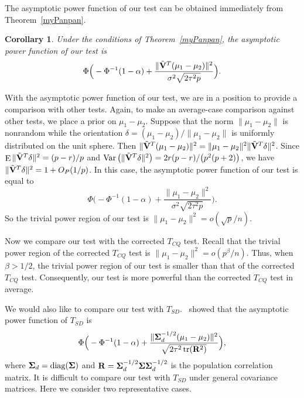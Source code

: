 \documentclass[3p]{elsarticle}
\DeclareMathOperator{\mytr}{tr}
\DeclareMathOperator{\mydiag}{diag}
\DeclareMathOperator{\myE}{E}
\DeclareMathOperator{\myVar}{Var}
\theoremstyle{plain}
\newtheorem{corollary}{\quad\quad Corollary}
\theoremstyle{definition}
\theoremstyle{remark}
\begin{document}
The asymptotic power function of our test can be obtained immediately from Theorem~\ref{myPanpan}.
\begin{corollary}\label{testPowerh}
    Under the conditions of Theorem~\ref{myPanpan}, the asymptotic power function of our test is
    \begin{equation*}
        \Phi\Big(-\Phi^{-1}(1-\alpha)+\frac{\|\tilde{\mathbf{V}}^T(\mu_1-\mu_2)\|^2}{\sigma^2\sqrt{2\tau^2p}}\Big).
    \end{equation*}
\end{corollary}

With the asymptotic power function of our test, we are in a position to provide a comparison with other tests.
Again, to make an average-case comparison against other tests, we place a prior on $\mu_1-\mu_2$.
Suppose that the norm $\|\mu_1-\mu_2\|$ is nonrandom while the orientation $\delta=(\mu_1-\mu_2)/\|\mu_1-\mu_2\|$ is uniformly distributed on the unit sphere.
Then $\|\tilde{\mathbf{V}}^T(\mu_1-\mu_2)\|^2=\|\mu_1-\mu_2\|^2 \|\tilde{\mathbf{V}}^T\delta\|^2$.
Since $\myE \|\tilde{\BV}^T\delta\|^2=(p-r)/p$ and $\myVar \big(\|\tilde{\BV}^T\delta\|^2\big) = 2r(p-r)/\big(p^2(p+2)\big)$, we have $\|\tilde{\mathbf{V}}^T\delta\|^2=1+O_P(1/p)$.
In this case, the asymptotic power function of our test is equal to
    \begin{equation*}
        \Phi\Big(-\Phi^{-1}(1-\alpha)+\frac{\|\mu_1-\mu_2\|^2}{\sigma^2\sqrt{2\tau^2p}}\Big).
    \end{equation*}
So the trivial power region of our test is $\|\mu_1-\mu_2\|^2= o(\sqrt{p}/n)$.

Now we compare our test with the corrected $T_{CQ}$ test.
Recall that the trivial power region of the corrected $T_{CQ}$ test is $\|\mu_1-\mu_2\|^2=o( p^{\beta}/n)$.
 Thus, when $\beta>1/2$, the trivial power region of our test is smaller than that of the corrected $T_{CQ}$ test.
Consequently, our test is more powerful than the corrected $T_{CQ}$ test in average.

 We would also like to compare our test with $T_{SD}$.~\cite{Srivastava2008A} showed that the asymptotic power function of $T_{SD}$ is
 $$
        \Phi\Big(-\Phi^{-1}(1-\alpha)+\frac{\|\bSigma_d^{-1/2}(\mu_1-\mu_2)\|^2}{\sqrt{2\tau^2\mytr(\BR^2)}}\Big),
 $$
 where $\bSigma_d=\mydiag(\bSigma)$ and $\mathbf{R}=\boldsymbol{\Sigma}_d^{-1/2} \boldsymbol{\Sigma} \boldsymbol{\Sigma}_d^{-1/2}$ is the population correlation matrix.
 It is difficult to compare our test with $T_{SD}$ under general covariance matrices.
 Here we consider two representative cases.
\end{document}
